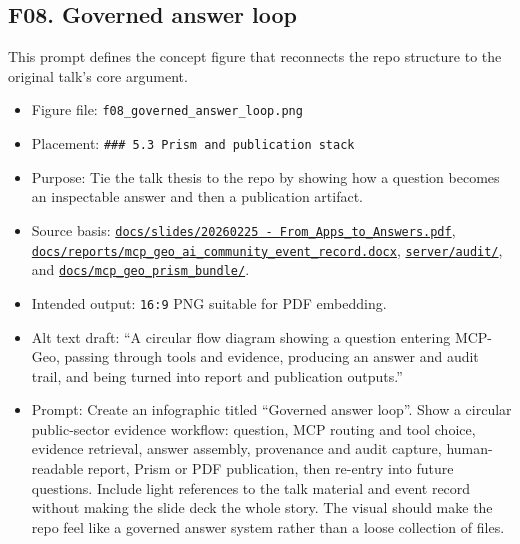 \subsection{F08. Governed answer loop}\label{f08.-governed-answer-loop}

This prompt defines the concept figure that reconnects the repo
structure to the original talk's core argument.

\begin{itemize}
\tightlist
\item
  Figure file: \texttt{f08\_governed\_answer\_loop.png}
\item
  Placement: \texttt{\#\#\#\ 5.3\ Prism\ and\ publication\ stack}
\item
  Purpose: Tie the talk thesis to the repo by showing how a question
  becomes an inspectable answer and then a publication artifact.
\item
  Source basis:
  \href{https://github.com/chris-page-gov/mcp-geo/blob/fe862910da246ca77f374cfbe484985f5df4d316/docs/slides/20260225\%20-\%20From_Apps_to_Answers.pdf}{\texttt{docs/slides/20260225\ -\ From\_Apps\_to\_Answers.pdf}},
  \href{https://github.com/chris-page-gov/mcp-geo/blob/fe862910da246ca77f374cfbe484985f5df4d316/docs/reports/mcp_geo_ai_community_event_record.docx}{\texttt{docs/reports/mcp\_geo\_ai\_community\_event\_record.docx}},
  \href{https://github.com/chris-page-gov/mcp-geo/tree/fe862910da246ca77f374cfbe484985f5df4d316/server/audit}{\texttt{server/audit/}},
  and
  \href{https://github.com/chris-page-gov/mcp-geo/tree/fe862910da246ca77f374cfbe484985f5df4d316/docs/mcp_geo_prism_bundle}{\texttt{docs/mcp\_geo\_prism\_bundle/}}.
\item
  Intended output: \texttt{16:9} PNG suitable for PDF embedding.
\item
  Alt text draft: ``A circular flow diagram showing a question entering
  MCP-Geo, passing through tools and evidence, producing an answer and
  audit trail, and being turned into report and publication outputs.''
\item
  Prompt: Create an infographic titled ``Governed answer loop''. Show a
  circular public-sector evidence workflow: question, MCP routing and
  tool choice, evidence retrieval, answer assembly, provenance and audit
  capture, human-readable report, Prism or PDF publication, then
  re-entry into future questions. Include light references to the talk
  material and event record without making the slide deck the whole
  story. The visual should make the repo feel like a governed answer
  system rather than a loose collection of files.
\end{itemize}
